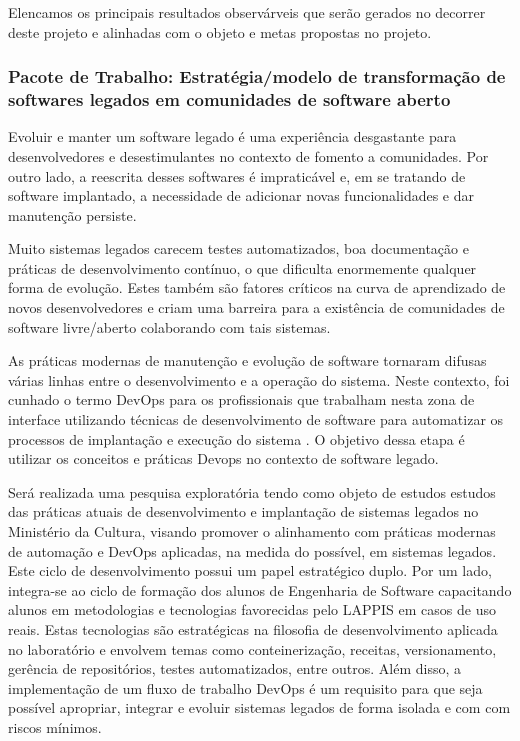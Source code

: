 Elencamos os principais resultados observárveis que serão gerados no decorrer 
deste projeto e alinhadas com o objeto e metas propostas no projeto.


\subsubsection{Pacote de Trabalho: Estratégia/modelo de transformação de 
softwares legados em comunidades de software aberto}

Evoluir e manter um software legado é uma experiência desgastante para 
desenvolvedores e desestimulantes no contexto de fomento a comunidades. Por outro lado, 
a reescrita desses softwares é impraticável e, em se tratando de software implantado,
a necessidade de adicionar novas funcionalidades e dar manutenção persiste. 

Muito sistemas legados carecem testes automatizados, boa documentação e práticas 
de desenvolvimento contínuo, o que dificulta enormemente qualquer forma de evolução.
Estes também são fatores críticos na curva de aprendizado de novos desenvolvedores
e criam uma barreira para a existência de comunidades de software livre/aberto 
colaborando com tais sistemas.  

As práticas modernas de manutenção e evolução de software tornaram difusas várias linhas 
entre o desenvolvimento e a operação do sistema. Neste contexto, foi cunhado o termo DevOps para 
os profissionais que trabalham nesta zona de interface utilizando técnicas de desenvolvimento
de software para automatizar os processos de implantação e execução do sistema 
\cite{deFranca:2016:CDH:2973839.2973845}. O objetivo dessa etapa é utilizar os
conceitos e práticas Devops no contexto de software legado.

Será realizada uma pesquisa exploratória tendo como objeto de estudos estudos 
das práticas atuais de desenvolvimento e implantação de sistemas legados no 
Ministério da Cultura, visando promover o alinhamento com práticas modernas de 
automação e DevOps aplicadas, na medida do possível, em sistemas legados. 
Este ciclo de desenvolvimento possui um papel estratégico duplo. Por um lado, 
integra-se ao ciclo de formação dos alunos de Engenharia de Software capacitando 
alunos em metodologias e tecnologias favorecidas pelo LAPPIS em casos de uso reais. 
Estas tecnologias são estratégicas na filosofia de desenvolvimento aplicada no 
laboratório e envolvem temas como conteinerização, receitas, versionamento, gerência
de repositórios, testes automatizados, entre outros. Além disso, a implementação
de um fluxo de trabalho DevOps é um requisito para que seja possível apropriar, 
integrar e evoluir sistemas legados de forma isolada e com com riscos mínimos. 


